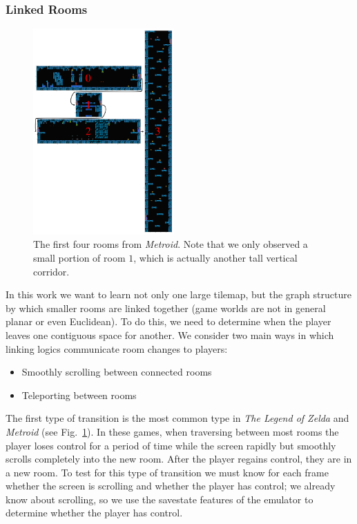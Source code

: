 \documentclass[12pt]{report}
\begin{document}
\subsubsection*{Linked Rooms} \label{sec:links}


\begin{figure}
\centering
\includegraphics[width=0.48\textwidth]{figures/Metroid.pdf}

\caption{The first four rooms from \emph{Metroid}.  Note that we only observed a small portion of room $1$, which is actually another tall vertical corridor.}
\label{fig:metroid}
\end{figure}

In this work we want to learn not only one large tilemap, but the graph structure by which smaller rooms are linked together (game worlds are not in general planar or even Euclidean).
To do this, we need to determine when the player leaves one contiguous space for another.
We consider two main ways in which linking logics communicate room changes to players:
\begin{itemize}
\item Smoothly scrolling between connected rooms
\item Teleporting between rooms
\end{itemize}
The first type of transition is the most common type in \emph{The Legend of Zelda} and \emph{Metroid} (see Fig.~\ref{fig:metroid}).
In these games, when traversing between most rooms the player loses control for a period of time while the screen rapidly but smoothly scrolls completely into the new room.
After the player regains control, they are in a new room.
To test for this type of transition we must know for each frame whether the screen is scrolling and whether the player has control; we already know about scrolling, so we use the savestate features of the emulator to determine whether the player has control.
\end{document}
